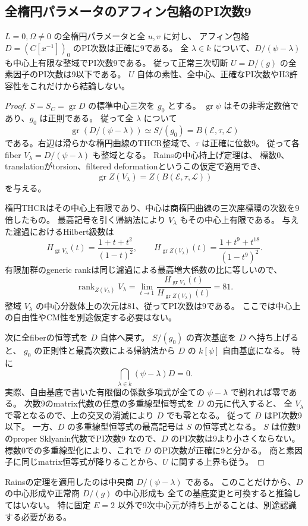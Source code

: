 \subsection{全楕円パラメータのアフィン包絡のPI次数9}
\label{subsec:cubic-third-root-unit-boundary-L-ambient-degree}
\begin{theorem}[中央三次の全fiberからのPI次数]
\label{thm:cubic-third-root-unit-boundary-L-ambient-degree}
$L=0,\Omega\ne0$ の全楕円パラメータと全 $u,v$ に対し、
アフィン包絡 $D=(C[x^{-1}])_0$ のPI次数は正確に9である。
全 $\lambda\in k$ について、$D/(\psi-\lambda)$ も中心上有限な整域でPI次数9である。
従って正常三次切断 $U=D/(g)$ の全素因子のPI次数は9以下である。
$U$ 自体の素性、全中心、正確なPI次数やH3許容性をこれだけから結論しない。
\end{theorem}
\begin{proof}
$S=S_C=\operatorname{gr}D$ の標準中心三次を $g_0$ とする。
$\operatorname{gr}\psi$ はその非零定数倍であり、$g_0$ は正則である。
従って全 $\lambda$ について
\[
 \operatorname{gr}(D/(\psi-\lambda))\simeq S/(g_0)
   =B(\mathcal E,\tau,\mathcal L)
\]
である。右辺は滑らかな楕円曲線のTHCR整域で、$\tau$ は正確に位数9。
従って各fiber $V_\lambda=D/(\psi-\lambda)$ も整域となる。
Rainsの中心持上げ定理\cite[Theorem~2.13]{RainsCut}は、
標数0、translationがtorsion、filtered deformationというこの仮定で適用でき、
\[
 \operatorname{gr}Z(V_\lambda)=Z(B(\mathcal E,\tau,\mathcal L))
\]
を与える。

楕円THCRはその中心上有限であり、中心は商楕円曲線の三次座標環の次数を9倍したもの。
最高記号を引く帰納法により $V_\lambda$ もその中心上有限である。
与えた濾過におけるHilbert級数は
\[
 H_{\operatorname{gr}V_\lambda}(t)=\frac{1+t+t^2}{(1-t)^2},\qquad
 H_{\operatorname{gr}Z(V_\lambda)}(t)
   =\frac{1+t^9+t^{18}}{(1-t^9)^2}.
\]
有限加群のgeneric rankは同じ濾過による最高増大係数の比に等しいので、
\[
 \operatorname{rank}_{Z(V_\lambda)}V_\lambda
   =\lim_{t\to1}\frac{H_{\operatorname{gr}V_\lambda}(t)}
                           {H_{\operatorname{gr}Z(V_\lambda)}(t)}=81.
\]
整域 $V_\lambda$ の中心分数体上の次元は81、従ってPI次数は9である。
ここでは中心上の自由性やCM性を別途仮定する必要はない。

次に全fiberの恒等式を $D$ 自体へ戻す。
$S/(g_0)$ の斉次基底を $D$ へ持ち上げると、
$g_0$ の正則性と最高次数による帰納法から $D$ の $k[\psi]$ 自由基底になる。
特に
\[
 \bigcap_{\lambda\in k}(\psi-\lambda)D=0.
\]
実際、自由基底で書いた有限個の係数多項式が全ての $\psi-\lambda$ で割れれば零である。
次数9のmatrix代数の任意の多重線型恒等式を $D$ の元に代入すると、
全 $V_\lambda$ で零となるので、上の交叉の消滅により $D$ でも零となる。
従って $D$ はPI次数9以下。
一方、$D$ の多重線型恒等式の最高記号は $S$ の恒等式となる。
$S$ は位数9のproper Sklyanin代数でPI次数9
\cite[Theorem~3.7]{SmithTateCenters}なので、$D$ のPI次数は9より小さくならない。
標数0での多重線型化により、これで $D$ のPI次数が正確に9と分かる。
商と素因子に同じmatrix恒等式が降りることから、$U$ に関する上界も従う。
\end{proof}

\begin{remark}[中心持上げの対象]
Rainsの定理を適用したのは中央商 $D/(\psi-\lambda)$ である。
このことだけから、$D$ の中心形成や正常商 $D/(g)$ の中心形成も
全ての基底変更と可換すると推論してはいない。
特に固定 $E=2$ 以外で9次中心元が持ち上がることは、別途認識する必要がある。
\end{remark}
